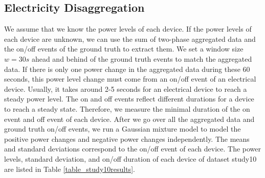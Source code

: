 \subsection{Electricity Disaggregation}
We assume that we know the power levels of each device. 
If the power levels of each device are unknown, 
we can use the sum of two-phase aggregated data and the on/off events of the 
ground truth to extract them. 
We set a window size $w=30s$ ahead and behind of the ground truth events to match 
the aggregated data.
If there is only one power change in the aggregated data during these 60 seconds, 
this power level change must come from an on/off event of an electrical device. 
Usually, it takes around 2-5 seconds for an electrical device to reach
a steady power level. 
The on and off events reflect different durations for a device to 
reach a steady state. 
Therefore, we measure the minimal duration of the on event and off event 
of each device. 
After we go over all the aggregated data and ground truth on/off events, 
we run a Gaussian mixture model to model the positive power changes and negative power changes
independently. The means and standard deviations correspond to  the on/off event of each device. 
The power levels, standard deviation, and on/off duration of each device of dataset study10 are listed in Table \ref{table_study10results}.



